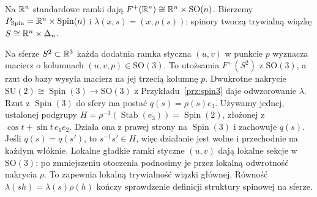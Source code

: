 \begin{przyklad}
Na $\mathbb{R}^n$ standardowe ramki dają
$F^+(\mathbb{R}^n)\cong\mathbb{R}^n\times\mathrm{SO}(n)$.
Bierzemy
$P_{\mathrm{Spin}}=\mathbb{R}^n\times\operatorname{Spin}(n)$
i $\lambda(x,s)=(x,\rho(s))$; spinory
tworzą trywialną wiązkę
$S\cong\mathbb{R}^n\times\Delta_n$.

Na sferze $S^2\subset\mathbb{R}^3$ każda dodatnia
ramka styczna $(u,v)$ w punkcie $p$ wyznacza
macierz o kolumnach $(u,v,p)\in\mathrm{SO}(3)$.
To utożsamia $F^+(S^2)$ z $\mathrm{SO}(3)$,
a rzut do bazy wysyła macierz na jej trzecią
kolumnę $p$. Dwukrotne nakrycie
$\mathrm{SU}(2)\cong\operatorname{Spin}(3)
\to\mathrm{SO}(3)$ z
Przykładu~\ref{prz:spin3} daje odwzorowanie $\lambda$.
Rzut z $\operatorname{Spin}(3)$ do sfery ma postać
$q(s)=\rho(s)e_3$. Używamy jednej, ustalonej podgrupy
$H=\rho^{-1}(\operatorname{Stab}(e_3))=\operatorname{Spin}(2)$,
złożonej z $\cos t+\sin t\,e_1e_2$. Działa ona z prawej strony
na $\operatorname{Spin}(3)$ i zachowuje $q(s)$.
Jeśli $q(s)=q(s')$, to $s^{-1}s'\in H$, więc działanie jest
wolne i przechodnie na każdym włóknie. Lokalne gładkie ramki
styczne $(u,v)$ dają lokalne sekcje w $\mathrm{SO}(3)$;
po zmniejszeniu otoczenia podnosimy je przez lokalną odwrotność
nakrycia $\rho$. To zapewnia lokalną trywialność wiązki głównej.
Równość $\lambda(sh)=\lambda(s)\rho(h)$ kończy sprawdzenie
definicji struktury spinowej na sferze.
\end{przyklad}

